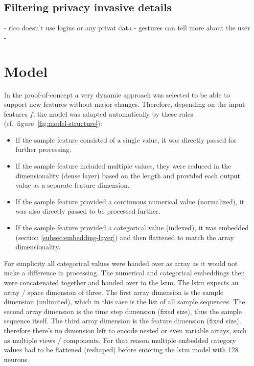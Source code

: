 \subsection{Filtering privacy invasive details}

- rico doesn't use logins or any privat data
- gestures can tell more about the user
-

\section{Model}

In the proof-of-concept a very dynamic approach was selected to be able to support new features without major changes.
Therefore, depending on the input features $f$, the model was adapted automatically by these rules (cf.\ figure~\ref{fig:model-structure}):

\begin{itemize}
  \item If the sample feature consisted of a single value, it was directly passed for further processing.
  \item If the sample feature included multiple values, they were reduced in the dimensionality (dense layer) based on the length and provided each output value as a separate feature dimension.
  \item If the sample feature provided a continuous numerical value (normalized), it was also directly passed to be processed further.
  \item If the sample feature provided a categorical value (indexed), it was embedded (section \ref{subsec:embedding-layer}) and then flattened to match the array dimensionality.
\end{itemize}

For simplicity all categorical values were handed over as array as it would not make a difference in processing.
The numerical and categorical embeddings then were concatenated together and handed over to the \gls{lstm}.
The \gls{lstm} expects an array / space dimension of three.
The first array dimension is the sample dimension (unlimited), which in this case is the list of all sample sequences.
The second array dimension is the time step dimension (fixed size), thus the sample sequence itself.
The third array dimension is the feature dimension (fixed size), therefore there's no dimension left to encode nested or even variable arrays, such as multiple views / components.
For that reason multiple embedded category values had to be flattened (reshaped) before entering the \gls{lstm} model with 128 neurons.

